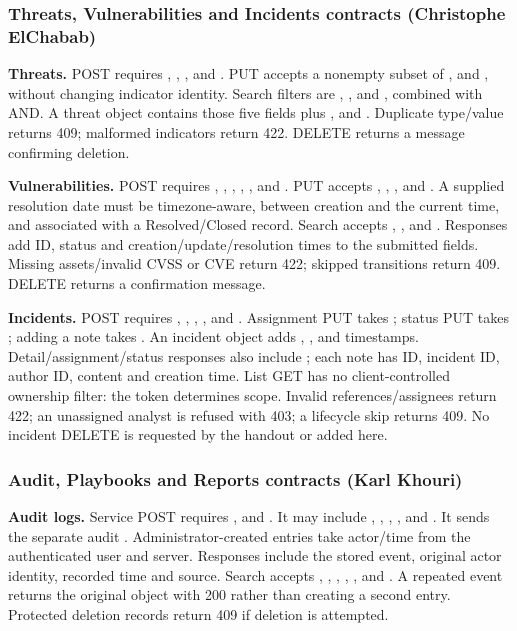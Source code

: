 \subsubsection{Threats, Vulnerabilities and Incidents contracts (Christophe ElChabab)}
\textbf{Threats.} POST requires , , ,  and . PUT accepts a nonempty subset of ,  and , without changing indicator identity. Search filters are , ,  and , combined with AND. A threat object contains those five fields plus ,  and . Duplicate type/value returns 409; malformed indicators return 422. DELETE returns a message confirming deletion.

\textbf{Vulnerabilities.} POST requires , , , , ,  and . PUT accepts , , ,  and . A supplied resolution date must be timezone-aware, between creation and the current time, and associated with a Resolved/Closed record. Search accepts , ,  and . Responses add ID, status and creation/update/resolution times to the submitted fields. Missing assets/invalid CVSS or CVE return 422; skipped transitions return 409. DELETE returns a confirmation message.

\textbf{Incidents.} POST requires , , , ,  and . Assignment PUT takes ; status PUT takes ; adding a note takes . An incident object adds , ,  and timestamps. Detail/assignment/status responses also include ; each note has ID, incident ID, author ID, content and creation time. List GET has no client-controlled ownership filter: the token determines scope. Invalid references/assignees return 422; an unassigned analyst is refused with 403; a lifecycle skip returns 409. No incident DELETE is requested by the handout or added here.

\subsubsection{Audit, Playbooks and Reports contracts (Karl Khouri)}
\textbf{Audit logs.} Service POST requires ,  and . It may include , , , ,  and . It sends the separate audit . Administrator-created entries take actor/time from the authenticated user and server. Responses include the stored event, original actor identity, recorded time and source. Search accepts , , , , ,  and . A repeated event returns the original object with 200 rather than creating a second entry. Protected deletion records return 409 if deletion is attempted.

